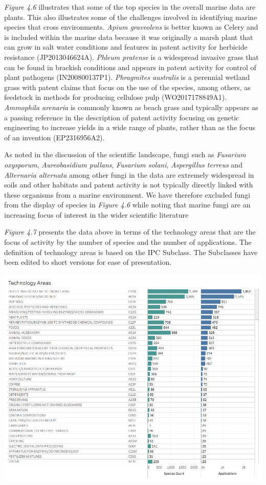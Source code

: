 \documentclass[]{book}
\theoremstyle{definition}
\theoremstyle{definition}
\theoremstyle{definition}
\theoremstyle{remark}
\begin{document}
\emph{Figure 4.6} illustrates that some of the top species in the
overall marine data are plants. This also illustrates some of the
challenges involved in identifying marine species that cross
environments. \emph{Apium graveolens} is better known as Celery and is
included within the marine data because it was originally a marsh plant
that can grow in salt water conditions and features in patent activity
for herbicide resistance (JP2013046624A). \emph{Phleum pratense} is a
widespread invasive grass that can be found in brackish conditions and
appears in patent activity for control of plant pathogens
(IN200800137P1). \emph{Phragmites australis} is a perennial wetland
grass with patent claims that focus on the use of the species, among
others, as feedstock in methods for producing cellulose pulp
(WO2017178849A1). \emph{Ammophila arenaria} is commonly known as beach
grass and typically appears as a passing reference in the description of
patent activity focusing on genetic engineering to increase yields in a
wide range of plants, rather than as the focus of an invention
(EP2316956A2).

As noted in the discussion of the scientific landscape, fungi such as
\emph{Fusarium oxysporum}, \emph{Aureobasidium pullans}, \emph{Fusarium
solani}, \emph{Aspergillus terreus} and \emph{Alternaria alternata}
among other fungi in the data are extremely widespread in soils and
other habitats and patent activity is not typically directly linked with
these organisms from a marine environment. We have therefore excluded
fungi from the display of species in \emph{Figure 4.6} while noting that
marine fungi are an increasing focus of interest in the wider scientific
literature \citep{Kim_2012}

\emph{Figure 4.7} presents the data above in terms of the technology
areas that are the focus of activity by the number of species and the
number of applications. The definition of technology areas is based on
the IPC Subclass. The Subclasses have been edited to short versions for
ease of presentation.

\includegraphics[width=13.89in]{images-patents/technology_areas_species}
\end{document}
